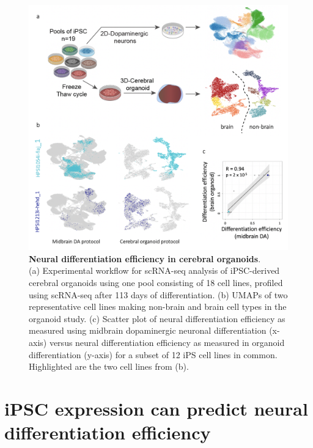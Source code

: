 \begin{figure}[htbp]
\centering
\includegraphics[width=14cm]{Chapter5/Fig/neuroseq_organoids.png}
\caption[Neural differentiation efficiency in cerebral organoids]{\textbf{Neural differentiation efficiency in cerebral organoids}.\\
(a) Experimental workflow for scRNA-seq analysis of iPSC-derived cerebral organoids using one pool consisting of 18 cell lines, profiled using scRNA-seq after 113 days of differentiation.
(b) UMAPs of two representative cell lines making non-brain and brain cell types in the organoid study. 
(c) Scatter plot of neural differentiation efficiency as measured using midbrain dopaminergic neuronal differentiation (x-axis) versus neural differentiation efficiency as measured in organoid differentiation (y-axis) for a subset of 12 iPS cell lines in common. 
Highlighted are the two cell lines from (b).}
\label{fig:neuroseq_organoids}
\end{figure}


\clearpage

\section{iPSC expression can predict neural differentiation efficiency}
\label{sec:neuroseq_ips}

